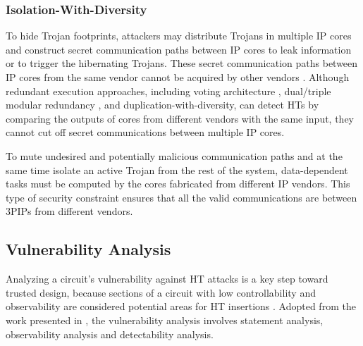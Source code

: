 \documentclass[10pt,journal, compsoc]{IEEEtran}
\begin{document}
\subsubsection{Isolation-With-Diversity}

To hide Trojan footprints, attackers may distribute Trojans in multiple IP cores and construct secret communication paths between IP cores to leak information or to trigger the hibernating Trojans. These secret communication paths between IP cores from the same vendor cannot be acquired by other vendors \cite{article:JR3}. Although redundant execution approaches, including voting architecture \cite{conference:MB}, dual/triple modular redundancy \cite{conference:DG}, and duplication-with-diversity, can detect HTs by comparing the outputs of cores from different vendors with the same input, they cannot cut off secret communications between multiple IP cores.


To mute undesired and potentially malicious communication paths and at the same time isolate an active Trojan from the rest of the system, data-dependent tasks must be computed by the cores fabricated from different IP vendors. This type of security constraint ensures that all the valid communications are between 3PIPs from different vendors.





\subsection{Vulnerability Analysis}



Analyzing a circuit's vulnerability against HT attacks is a key step toward trusted design, because sections of a circuit with low controllability and observability are considered potential areas for HT insertions \cite{article:JC,article:YD}. Adopted from the work presented in \cite{conference:HS}, the vulnerability analysis involves statement analysis, observability analysis and detectability analysis.

\end{document}
